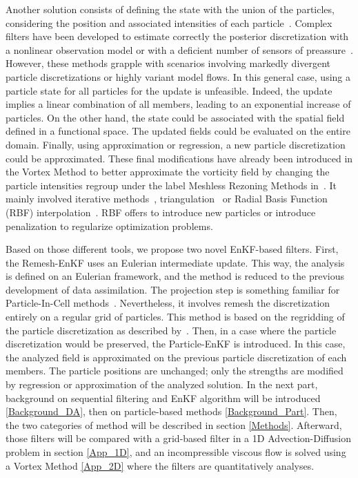 Another solution consists of defining the state with the union of the particles, considering the position and associated intensities of each particle~\cite{darakananda_data-assimilated_2018}. Complex filters have been developed to estimate correctly the posterior discretization with a nonlinear observation model or with a deficient number of sensors of preassure~\cite{le_provost_low-rank_2021}.
However, these methods grapple with scenarios involving markedly divergent particle discretizations or highly variant model flows. In this general case, using a particle state for all particles for the update is unfeasible. Indeed, the update implies a linear combination of all members, leading to an exponential increase of particles.
On the other hand, the state could be associated with the spatial field defined in a functional space. The updated fields could be evaluated on the entire domain. Finally, using approximation or regression, a new particle discretization could be approximated. These final modifications have already been introduced in the Vortex Method to better approximate the vorticity field by changing the particle intensities regroup under the label Meshless Rezoning Methods in~\cite{mimeau_review_2021}. It mainly involved iterative methods~\cite{beale_accuracy_1988},  triangulation~\cite{russo_1994} or Radial Basis Function (RBF) interpolation~\cite{barba_lorena_a_vortex_2004,sperotto_2021}. RBF offers to introduce new particles or introduce penalization to regularize optimization problems.\newline

Based on those different tools, we propose two novel EnKF-based filters. First, the Remesh-EnKF uses an Eulerian intermediate update. This way, the analysis is defined on an Eulerian framework, and the method is reduced to the previous development of data assimilation. The projection step is something familiar for Particle-In-Cell methods~\cite{sulsky_particle_1994,brackbill_flip_1988}. Nevertheless, it involves remesh the discretization entirely on a regular grid of particles. This method is based on the regridding of the particle discretization as described by~\cite{cottet_multi-purpose_1999}.
Then, in a case where the particle discretization would be preserved, the Particle-EnKF is introduced. In this case, the analyzed field is approximated on the previous particle discretization of each members. The particle positions are unchanged; only the strengths are modified by regression or approximation of the analyzed solution.
In the next part, background on sequential filtering and EnKF algorithm will be introduced \ref{Background_DA}, then on particle-based methods \ref{Background_Part}. Then, the two categories of method will be described in section \ref{Methods}. Afterward, those filters will be compared with a grid-based filter in a 1D Advection-Diffusion problem in section \ref{App_1D}, and an incompressible viscous flow is solved using a Vortex Method \ref{App_2D} where the filters are quantitatively analyses.






